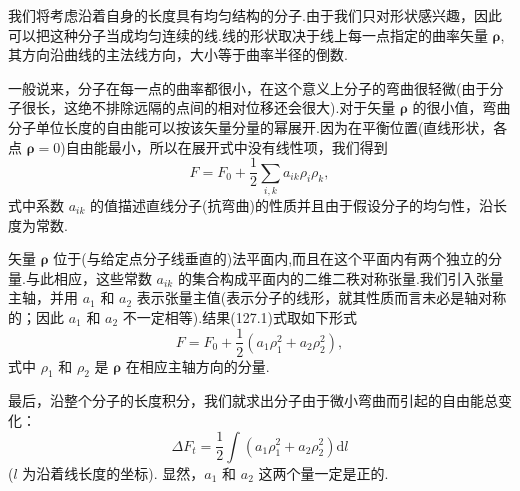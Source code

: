 我们将考虑沿着自身的长度具有均匀结构的分子.由于我们只对形状感兴趣，因此可以把这种分子当成均匀连续的线.线的形状取决于线上每一点指定的曲率矢量 $\boldsymbol{\rho}$,其方向沿曲线的主法线方向，大小等于曲率半径的倒数.

一般说来，分子在每一点的曲率都很小，在这个意义上分子的弯曲很轻微(由于分子很长，这绝不排除远隔的点间的相对位移还会很大).对于矢量 $\boldsymbol{\rho}$ 的很小值，弯曲分子单位长度的自由能可以按该矢量分量的幂展开.因为在平衡位置(直线形状，各点 $\boldsymbol{\rho}=0$)自由能最小，所以在展开式中没有线性项，我们得到
\begin{equation}
  F=F_0+\frac{1}{2}\sum_{i,k}a_{ik}\rho_i\rho_k,
\end{equation}
式中系数 $a_{ik}$ 的值描述直线分子(抗弯曲)的性质并且由于假设分子的均匀性，沿长度为常数.

矢量 $\boldsymbol{\rho}$ 位于(与给定点分子线垂直的)法平面内,而且在这个平面内有两个独立的分量.与此相应，这些常数 $a_{ik}$ 的集合构成平面内的二维二秩对称张量.我们引入张量主轴，并用 $a_1$ 和 $a_2$ 表示张量主值(表示分子的线形，就其性质而言未必是轴对称的；因此 $a_1$ 和 $a_2$ 不一定相等).结果(127.1)式取如下形式
\begin{equation*}
  F=F_0+\frac{1}{2}\left(a_1\rho_1^2+a_2\rho_2^2\right),
\end{equation*}
式中 $\rho_1$ 和 $\rho_2$ 是 $\boldsymbol{\rho}$ 在相应主轴方向的分量.

最后，沿整个分子的长度积分，我们就求出分子由于微小弯曲而引起的自由能总变化：
\begin{equation}
  \Delta F_t=\frac{1}{2}\int\left(a_1\rho_1^2+a_2\rho_2^2\right)\mathrm{d}l
\end{equation}
($l$ 为沿着线长度的坐标). 显然，$a_1$ 和 $a_2$ 这两个量一定是正的.

